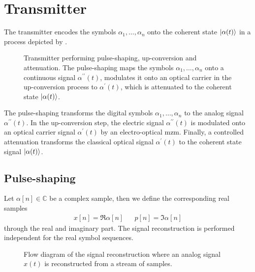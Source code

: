 \section{Transmitter}


The transmitter encodes the symbols $\alpha_1,\dots,\alpha_n$ onto the coherent state $\ket{\alpha(t)}$ in a process depicted by .
\begin{figure}[htb]
	\centering
	
	\caption{Transmitter performing pulse-shaping, up-conversion and attenuation. The pulse-shaping maps the symbols $\alpha_1,\dots,\alpha_n$ onto a continuous signal $\alpha^{\prime\prime}(t)$, modulates it onto an optical carrier in the up-conversion process to $\alpha^{\prime}(t)$, which is attenuated to the coherent state $\ket{\alpha(t)}$.}\label{fig:transmitter}
\end{figure}
The pulse-shaping transforms the digital symbols $\alpha_1,\dots,\alpha_n$ to the analog signal $\alpha^{\prime\prime}(t)$.
In the up-conversion step, the electric signal $\alpha^{\prime\prime}(t)$ is modulated onto an optical carrier signal $\alpha^{\prime}(t)$ by an electro-optical \gls{mzm}.
Finally, a controlled attenuation transforms the classical optical signal $\alpha^{\prime}(t)$ to the coherent state signal $\ket{\alpha(t)}$.

\subsection{Pulse-shaping}

Let $\alpha[n]\in\mathbb{C}$ be a complex sample, then we define the corresponding real samples
\begin{align}
	x[n]=\Re{\alpha[n]}
	&&
	p[n]=\Im{\alpha[n]}
\end{align}
through the real and imaginary part.
The signal reconstruction is performed independent for the real symbol sequences.
\begin{figure}[htb]
	\centering
	
	\caption{Flow diagram of the signal reconstruction where an analog signal $x(t)$ is reconstructed from a stream of samples.}\label{fig:transmitter}
\end{figure}


